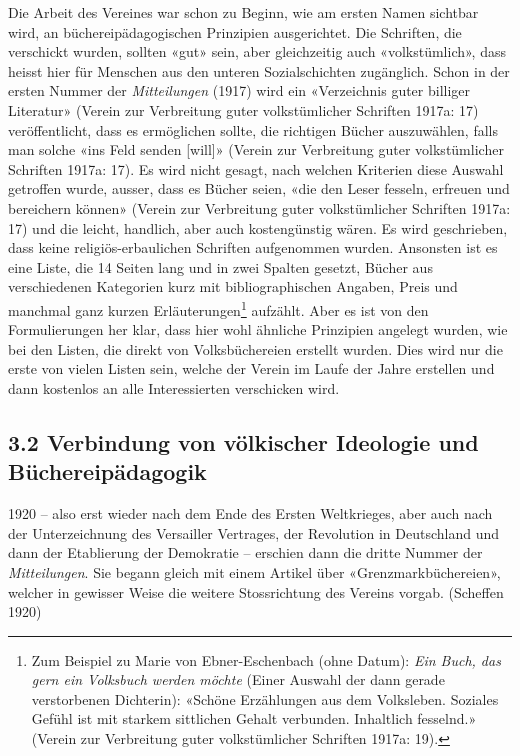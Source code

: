 \documentclass[a4paper,
fontsize=11pt,
oneside,
numbers=noperiodatend,
parskip=half-,
bibliography=totoc,
final
]{scrartcl}
\begin{document}
Die Arbeit des Vereines war schon zu Beginn, wie am ersten Namen
sichtbar wird, an büchereipädagogischen Prinzipien ausgerichtet. Die
Schriften, die verschickt wurden, sollten «gut» sein, aber gleichzeitig
auch «volkstümlich», dass heisst hier für Menschen aus den unteren
Sozialschichten zugänglich. Schon in der ersten Nummer der
\emph{Mitteilungen} (1917) wird ein «Verzeichnis guter billiger
Literatur» (Verein zur Verbreitung guter volkstümlicher Schriften 1917a:
17) veröffentlicht, dass es ermöglichen sollte, die richtigen Bücher
auszuwählen, falls man solche «ins Feld senden {[}will{]}» (Verein zur
Verbreitung guter volkstümlicher Schriften 1917a: 17). Es wird nicht
gesagt, nach welchen Kriterien diese Auswahl getroffen wurde, ausser,
dass es Bücher seien, «die den Leser fesseln, erfreuen und bereichern
können» (Verein zur Verbreitung guter volkstümlicher Schriften 1917a:
17) und die leicht, handlich, aber auch kostengünstig wären. Es wird
geschrieben, dass keine religiös-erbaulichen Schriften aufgenommen
wurden. Ansonsten ist es eine Liste, die 14 Seiten lang und in zwei
Spalten gesetzt, Bücher aus verschiedenen Kategorien kurz mit
bibliographischen Angaben, Preis und manchmal ganz kurzen
Erläuterungen\footnote{Zum Beispiel zu Marie von Ebner-Eschenbach (ohne
  Datum): \emph{Ein Buch, das gern ein Volksbuch werden möchte} (Einer
  Auswahl der dann gerade verstorbenen Dichterin): «Schöne Erzählungen
  aus dem Volksleben. Soziales Gefühl ist mit starkem sittlichen Gehalt
  verbunden. Inhaltlich fesselnd.» (Verein zur Verbreitung guter
  volkstümlicher Schriften 1917a: 19).} aufzählt. Aber es ist von den
Formulierungen her klar, dass hier wohl ähnliche Prinzipien angelegt
wurden, wie bei den Listen, die direkt von Volksbüchereien erstellt
wurden. Dies wird nur die erste von vielen Listen sein, welche der
Verein im Laufe der Jahre erstellen und dann kostenlos an alle
Interessierten verschicken wird.

\hypertarget{verbindung-von-vuxf6lkischer-ideologie-und-buxfcchereipuxe4dagogik}{%
\subsection{3.2 Verbindung von völkischer Ideologie und
Büchereipädagogik}\label{verbindung-von-vuxf6lkischer-ideologie-und-buxfcchereipuxe4dagogik}}

1920 -- also erst wieder nach dem Ende des Ersten Weltkrieges, aber auch
nach der Unterzeichnung des Versailler Vertrages, der Revolution in
Deutschland und dann der Etablierung der Demokratie -- erschien dann die
dritte Nummer der \emph{Mitteilungen}. Sie begann gleich mit einem
Artikel über «Grenzmarkbüchereien», welcher in gewisser Weise die
weitere Stossrichtung des Vereins vorgab. (Scheffen 1920)
\end{document}
